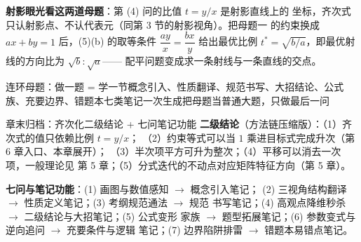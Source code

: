 \begin{advancedonly}
\textbf{射影眼光看这两道母题}：第 (4) 问的比值 $t=y/x$ 是射影直线上的
坐标，齐次式只认射影点、不认代表元（同第 3 节的射影视角）。把母题一
的约束换成 $ax+by=1$ 后，(5)(b) 的取等条件 $\dfrac{ay}{x}=\dfrac{bx}{y}$
给出最优比例 $t^*=\sqrt{b/a}$，即最优射线的方向比为 $\sqrt b:\sqrt a$——
配平问题变成求一条射线与一条直线的交点。
\end{advancedonly}

\begin{conccard}{连环母题：做一题 = 学一节}{概念引入、性质翻译、规范书写、大招结论、公式族、充要边界、错题本七类笔记一次生成}{把母题当普通大题，只做最后一问}
\end{conccard}

\begin{notezone}{章末归档：齐次化二级结论 + 七问笔记功能}
\textbf{二级结论}（方法链压缩版）：（1）齐次式的值只依赖比例 $t=y/x$；
（2）约束等式可以当 $1$ 乘进目标式完成升次（第 6 章入口、本章展开）；
（3）半次项平方可升为整次；（4）平移可以消去一次项，一般理论见
第 5 章；（5）分式迭代的不动点对应矩阵特征方向（第 5 章）。

\textbf{七问与笔记功能}：(1) 画图与数值感知 $\to$ 概念引入笔记；
(2) 三视角结构翻译 $\to$ 性质定义笔记；(3) 考纲规范通法 $\to$ 规范
书写笔记；(4) 高观点降维秒杀 $\to$ 二级结论与大招笔记；(5) 公式变形
家族 $\to$ 题型拓展笔记；(6) 参数变式与逆向追问 $\to$ 充要条件与逻辑
笔记；(7) 边界陷阱排雷 $\to$ 错题本易错点笔记。
\end{notezone}

